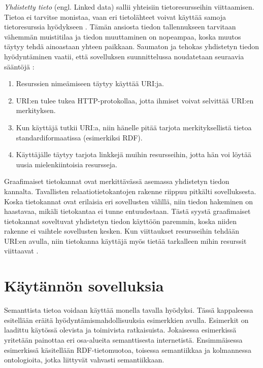 \documentclass[finnish, 12pt, a4paper, elec, utf8, pdfa, online]{aaltothesis}
\begin{document}
{\textit{Yhdistetty tieto} (engl. Linked data) sallii yhteisiin tietoresursseihin viittaamisen. Tietoa ei tarvitse monistaa, vaan eri tietolähteet voivat käyttää samoja tietoresurssia hyödykseen \cite{linked_data_finlad}. Tämän ansiosta tiedon tallennukseen tarvitaan vähemmän muistitilaa ja tiedon muuttaminen on nopeampaa, koska muutos täytyy tehdä ainoastaan yhteen paikkaan. Saumaton ja tehokas yhdistetyn tiedon hyödyntäminen vaatii, että sovelluksen suunnittelussa noudatetaan seuraavia sääntöjä \cite{cambridge_linked}:
\begin{enumerate}
\item Resurssien nimeämiseen täytyy käyttää URI:ja.
\item URI:en tulee tukea HTTP-protokollaa, jotta ihmiset voivat selvittää URI:en merkityksen.
\item Kun käyttäjä tutkii URI:a, niin hänelle pitää tarjota merkityksellistä tietoa standardiformaatissa (esimerkiksi RDF).
\item Käyttäjälle täytyy tarjota linkkejä muihin resursseihin, jotta hän voi löytää uusia mielenkiintoisia resursseja.
\end{enumerate}
\vspace{0.5cm}

Graafimaiset tietokannat ovat merkittävässä asemassa yhdistetyn tiedon kannalta. Tavallisten relaatiotietokantojen rakenne riippuu pitkälti sovelluksesta. Koska tietokannat ovat erilaisia eri sovellusten välillä, niin tiedon hakeminen on haastavaa, mikäli tietokantaa ei tunne entuudestaan. Tästä syystä graafimaiset tietokannat soveltuvat yhdistetyn tiedon käyttöön paremmin, koska niiden rakenne ei vaihtele sovellusten kesken. Kun viittaukset resursseihin tehdään URI:en avulla, niin tietokanna käyttäjä myös tietää tarkalleen mihin resurssit viittaavat \cite{cambridge_linked}.

\clearpage
\section{Käytännön sovelluksia}

Semanttista tietoa voidaan käyttää monella tavalla hyödyksi. Tässä kappaleessa esitellään eräitä hyödyntämismahdollisuuksia esimerkkien avulla. Esimerkit on laadittu käytössä olevista ja toimivista ratkaisuista. Jokaisessa esimerkissä yritetään painottaa eri osa-alueita semanttisesta internetistä. Ensimmäisessa esimerkissä käsitellään RDF-tietomuotoa, toisessa semantiikkaa ja kolmannessa ontologioita, jotka liittyvät vahvasti semantiikkaan.


}
\end{document}
